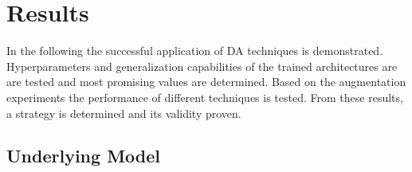 
\chapter{Results}

In the following the successful application of DA techniques is demonstrated. Hyperparameters and generalization capabilities of the trained  architectures are are tested and most promising values are determined. Based on the augmentation experiments the performance of different techniques is tested. From these results, a strategy is determined and its validity proven.

\section{Underlying Model}


